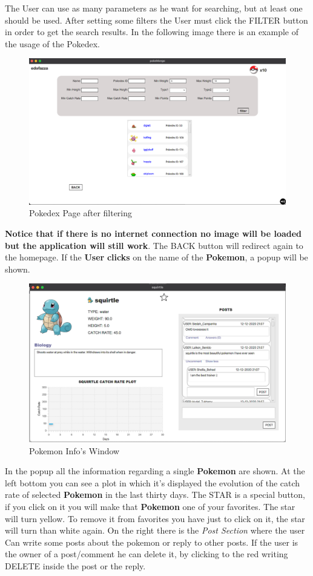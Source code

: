 The User can use as many parameters as he want for searching, but at least one should be used. After setting some filters the User must click the FILTER button in order to get the search results. In the following image there is an example of the usage of the Pokedex.
\begin{figure}[H]
	\centering
	\includegraphics[width=\textwidth]{img/userManual/pokedex2.png}
	\caption{Pokedex Page after filtering}
\end{figure}
\textbf{Notice that if there is no internet connection no image will be loaded but the application will still work}. The BACK button will redirect again to the homepage. If the \textbf{User} \textbf{clicks} on the name of the \textbf{Pokemon}, a popup will be shown. 
\begin{figure}[H]
	\centering
	\includegraphics[width=\textwidth]{img/userManual/pokemon_info.png}
	\caption{Pokemon Info's Window}
\end{figure}
In the popup all the information regarding a single \textbf{Pokemon} are shown. At the left bottom you can see a plot in which it’s displayed the evolution of the catch rate of selected \textbf{Pokemon} in the last thirty days. The STAR is a special button, if you click on it you will make that \textbf{Pokemon} one of your favorites. The star will turn yellow. To remove it from favorites you have just
to click on it, the star will turn than white again. On the right there is the \textit{Post Section} where the user Can write some posts about the pokemon or reply to other posts. If the user is the owner of a post/comment he can delete it, by clicking to the red writing DELETE inside the post or the reply.
